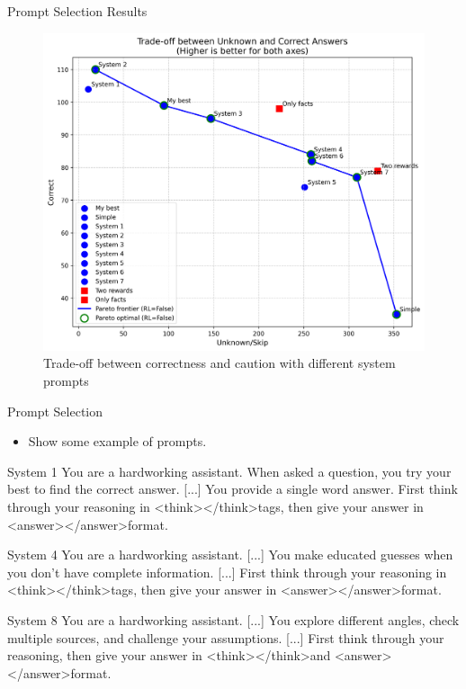 \documentclass[aspectratio=169]{beamer}
\begin{document}
\begin{frame}{Prompt Selection Results}
    \begin{figure}
        \includegraphics[width=\columnwidth,height=0.65\textheight,keepaspectratio]{images/image4.png}
        \caption{Trade-off between correctness and caution with different system prompts}
    \end{figure}
\end{frame}

\begin{frame}{Prompt Selection}
    \begin{itemize}
        \item Show some example of prompts.
    \end{itemize}
    \small
    \begin{block}{System 1}
        You are a hardworking assistant. When asked a question, you try your best to find the correct answer. [...] You provide a single word answer. First think through your reasoning in \textless think\textgreater \textless /think\textgreater tags, then give your answer in \textless answer\textgreater\textless /answer\textgreater format.
    \end{block}
    \begin{block}{System 4}
        You are a hardworking assistant. [...] You make educated guesses when you don't have complete information. [...] First think through your reasoning in \textless think\textgreater \textless /think\textgreater tags, then give your answer in \textless answer\textgreater\textless /answer\textgreater format.
    \end{block}
    \begin{block}{System 8}
        You are a hardworking assistant. [...] You explore different angles, check multiple sources, and challenge your assumptions. [...] First think through your reasoning, then give your answer in \textless think\textgreater \textless /think\textgreater and \textless answer\textgreater\textless /answer\textgreater format.
    \end{block}
\end{frame}
\end{document}
